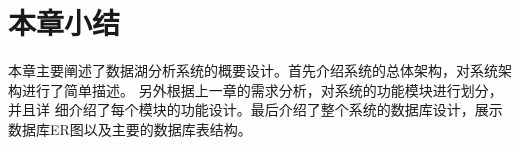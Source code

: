 \section{本章小结}

本章主要阐述了数据湖分析系统的概要设计。首先介绍系统的总体架构，对系统架构进行了简单描述。
另外根据上一章的需求分析，对系统的功能模块进行划分，并且详
细介绍了每个模块的功能设计。最后介绍了整个系统的数据库设计，展示数据库ER图以及主要的数据库表结构。

